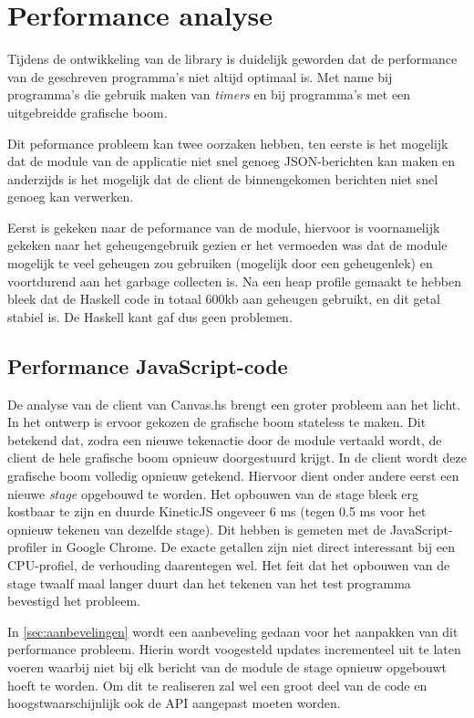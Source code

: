 \section{Performance analyse} \label{sec:performance}

Tijdens de ontwikkeling van de library is duidelijk geworden dat de performance van de geschreven programma's niet altijd optimaal is. Met name bij programma's die gebruik maken van \emph{timers} en bij programma's met een uitgebreidde grafische boom.

Dit peformance probleem kan twee oorzaken hebben, ten eerste is het mogelijk dat de module van de applicatie niet snel genoeg JSON-berichten kan maken en anderzijds is het mogelijk dat de client de binnengekomen berichten niet snel genoeg kan verwerken.

Eerst is gekeken naar de peformance van de module, hiervoor is voornamelijk gekeken naar het geheugengebruik gezien er het vermoeden was dat de module mogelijk te veel geheugen zou gebruiken (mogelijk door een geheugenlek) en voortdurend aan het garbage collecten is. Na een heap profile gemaakt te hebben bleek dat de Haskell code in totaal 600kb aan geheugen gebruikt, en dit getal stabiel is. De Haskell kant gaf dus geen problemen.

\subsection{Performance JavaScript-code}

De analyse van de client van Canvas.hs brengt een groter probleem aan het licht. In het ontwerp is ervoor gekozen de grafische boom stateless te maken. Dit betekend dat, zodra een nieuwe tekenactie door de module vertaald wordt, de client de hele grafische boom opnieuw doorgestuurd krijgt. In de client wordt deze grafische boom volledig opnieuw getekend. Hiervoor dient onder andere eerst een nieuwe \emph{stage} opgebouwd te worden.
Het opbouwen van de stage bleek erg kostbaar te zijn en duurde KineticJS ongeveer 6 ms (tegen 0.5 ms voor het opnieuw tekenen van dezelfde stage). Dit hebben is gemeten met de JavaScript-profiler in Google Chrome. De exacte getallen zijn niet direct interessant bij een CPU-profiel, de verhouding daarentegen wel. Het feit dat het opbouwen van de stage twaalf maal langer duurt dan het tekenen van het test programma bevestigd het probleem.

In \autoref{sec:aanbevelingen} wordt een aanbeveling gedaan voor het aanpakken van dit performance probleem. Hierin wordt voogesteld updates incrementeel uit te laten voeren waarbij niet bij elk bericht van de module de stage opnieuw opgebouwt hoeft te worden. Om dit te realiseren zal wel een groot deel van de code en hoogstwaarschijnlijk ook de API aangepast moeten worden.

